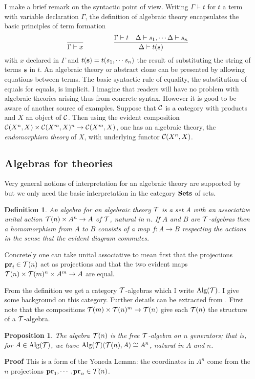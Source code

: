 \documentclass[12pt, amstex, amssymb]{article}
\newtheorem{proposition}[theorem]{Proposition}
\newtheorem{definition}[theorem]{Definition}
\newcommand{\mcat}{\cal}
\begin{document}
I make a brief remark on the syntactic point of view.
Writing $\Gamma \vdash t$ for $t$ a term with variable
declaration $\Gamma$, the definition of algebraic theory
encapsulates the basic 
principles of term formation
\[
 \dfrac{}{\Gamma \vdash x}
 \hspace{1.5cm} 
\dfrac{\Gamma \vdash t \quad \Delta \vdash s_1 , \cdots 
 \Delta \vdash s_n }{\Delta \vdash t({\bf s})}
\]
with $x$ declared in $\Gamma$ and $t({\bf s})= t(s_1, \cdots s_n)$ the result
of substituting the string of terms $\bf s$ in $t$. An algebraic
theory or abstract clone can be presented by allowing equations
between terms. The basic
syntactic rule of equality, the substitution of equals for 
equals, is implicit. 
I imagine that readers will have no problem with algebraic
theories arising thus
from concrete syntax. However it is good to be aware of another
source of examples. Suppose that $\cal C$ is a category with 
products and $X$ an object of $\cal C$. Then 
using the evident composition
${\cal C}(X^n,X) \times {\cal C}(X^m,X)^n \to {\cal C}(X^m,X)$,
one has
an algebraic theory, the {\em endomorphism theory} of $X$,
 with underlying functor
${\cal C}(X^n,X)$.

\subsection{Algebras for theories}\label{algebras}

Very general notions of interpretation for an algebraic theory 
are supported by \cite{FGHW} but we only need
the basic interpretation in the category $\bf Sets$ of sets. 
\begin{definition}
An algebra for an algebraic theory
$\mcat T$ is a set $A$ with an associative unital action
${\mcat T}(n) \times A^n \to A$ of $\mcat T$,
natural in $n$. If $A$ and $B$ are ${\mcat T}$-algebras then a homomorphism
from $A$ to $B$ consists of a map $f: A \to B$ respecting the actions
in the sense that the evident diagram commutes.
\end{definition}
Concretely one can take unital associative to mean first that
the projections ${\bf pr}_i \in {\mcat T}(n)$ act as projections
and that the two evident maps 
${\mcat T}(n) \times {\mcat T}(m)^n \times A^m \to A$
are equal.

From the definition we get a category $\mcat T$-algebras which I
write ${\rm Alg}({\mcat T})$. 
I give some background on this category. 
Further details can be extracted from
\cite{ARV11}. First note that
the compositions
${\mcat T}(m) \times {\mcat T}(n)^m \to {\mcat T}(n)$
give each ${\mcat T}(n)$ the structure of a $\mcat T$-algebra.
\begin{proposition}\label{free}
The algebra ${\mcat T}(n)$
is the free $\mcat T$-algebra on $n$ generators; that is,
for $A \in {\rm Alg}({\mcat T})$, we have
${\rm Alg}({\mcat T})({\mcat T}(n), A) \cong A^n$, natural in
$A$ and $n$.
\end{proposition}
{\bf Proof} This is a form of the Yoneda Lemma: the coordinates
in $A^n$ come from the $n$ projections 
${\bf pr}_1, \cdots ,{\bf pr}_n \in {\mcat T}(n)$.
\end{document}
